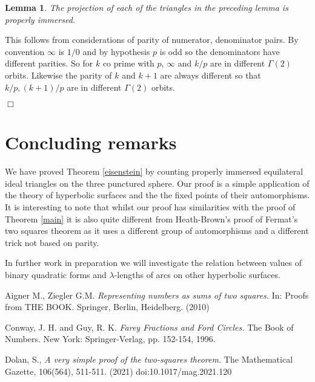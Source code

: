 \documentclass[12pt]{amsart}
\theoremstyle{plain}
\newtheorem{lemma}{Lemma}[section]
\theoremstyle{definition}
\begin{document}
\begin{lemma}\label{proper}
The projection of each of the triangles in the preceding lemma
is properly immersed.
\end{lemma}

\proof This follows from considerations of parity of numerator, denominator pairs.
By convention $\infty$ is $1/0$ and 
by hypothesis $p$ is odd so the denominators have different parities. So for $k$ co prime with $p$, 
$\infty$ and $k/p$ are in different $\Gamma(2)$ orbits.
Likewise the parity of $k$ and $k+1$ are always different
so that $k/p, (k+1)/p$ are in different $\Gamma(2)$ orbits.

\hfill $\Box$


\section{Concluding remarks}

We have proved Theorem \ref{eisenstein} by counting properly
immersed equilateral ideal triangles on the three punctured sphere.
Our proof is a simple application of the theory of hyperbolic
surfaces and the the fixed points of their automorphisms.
It is interesting to note that whilst our proof has similarities
with the proof of Theorem \ref{main} it is also quite different from
Heath-Brown's proof of Fermat's two squares theorem \cite{heath} as
it uses a different group of automorphisms and a different trick not
based on parity.


In further work in preparation we will investigate the relation  between values of
binary quadratic forms and $\lambda$-lengths of arcs
on other hyperbolic surfaces.


Aigner M., Ziegler G.M.  
\textit{Representing numbers as sums of two squares.} In: Proofs from THE BOOK. Springer, Berlin, Heidelberg. (2010)

Conway, J. H. and Guy, R. K. \textit{Farey Fractions and Ford
Circles.} The Book of Numbers. New York: Springer-Verlag, pp. 152-154, 1996.

Dolan, S., 
\textit{A very simple proof of the two-squares theorem.}
The Mathematical Gazette, 106(564), 511-511. (2021) doi:10.1017/mag.2021.120
%
%
\end{document}
